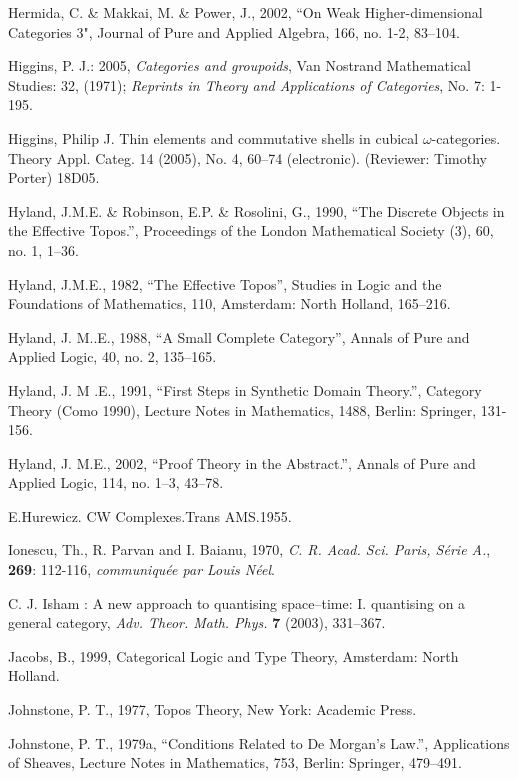 \documentclass[12pt]{article}
\begin{document}
\begin{thebibliography}{399}
Hermida, C. \& Makkai, M. \& Power, J., 2002, ``On Weak Higher-dimensional Categories 3", Journal of Pure and Applied Algebra, 166, no. 1-2, 83--104.  

Higgins, P. J.: 2005, \emph{Categories and groupoids}, Van Nostrand Mathematical Studies: 32, (1971); 
\emph{Reprints in Theory and Applications of Categories}, No. 7: 1-195.

Higgins, Philip J. Thin elements and commutative shells in cubical
$\omega$-categories. Theory Appl. Categ. 14 (2005), No. 4, 60--74
(electronic). (Reviewer: Timothy Porter) 18D05.

Hyland,  J.M.E. \& Robinson,  E.P. \& Rosolini, G., 1990, ``The Discrete Objects in the Effective Topos.'', Proceedings of the London Mathematical Society (3), 60, no. 1, 1--36. 

Hyland,  J.M.E., 1982, ``The Effective Topos'', Studies in Logic and the Foundations of Mathematics, 110, Amsterdam: North Holland, 165--216.  

Hyland, J. M..E., 1988, ``A Small Complete Category'', Annals of Pure and Applied Logic, 40, no. 2, 135--165. 

Hyland,  J. M .E., 1991, ``First Steps in Synthetic Domain Theory.'', Category Theory (Como 1990), Lecture Notes in Mathematics, 1488, Berlin: Springer, 131-156.  

Hyland, J. M.E., 2002, ``Proof Theory in the Abstract.'', Annals of Pure and Applied Logic, 114, no. 1--3, 43--78. 

E.Hurewicz. CW Complexes.Trans AMS.1955.

Ionescu, Th., R. Parvan and I. Baianu, 1970, {\em C. R. Acad. Sci. Paris, S\'erie A.}, \textbf{269}:
112-116, {\em communiqu\'ee par Louis N\'eel}.  

C. J. Isham : A new approach to quantising space--time: I.
quantising on a general category, \emph{Adv. Theor. Math. Phys.}
\textbf{7} (2003), 331--367.

Jacobs, B., 1999, Categorical Logic and Type Theory, Amsterdam: North Holland.  

Johnstone, P. T., 1977, Topos Theory, New York: Academic Press. 

Johnstone, P. T., 1979a, ``Conditions Related to De Morgan's Law.'', Applications of Sheaves, Lecture Notes in Mathematics, 753, Berlin: Springer, 479--491. 


\end{thebibliography}
\end{document}
